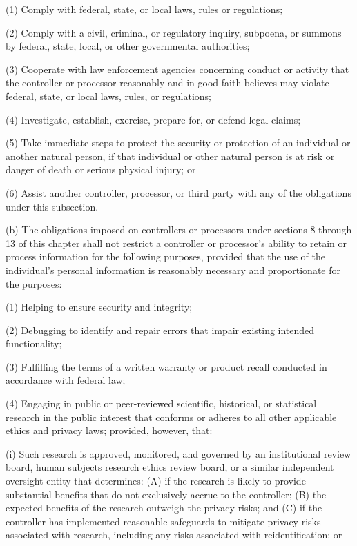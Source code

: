 (1) Comply with federal, state, or local laws, rules or regulations;

(2) Comply with a civil, criminal, or regulatory inquiry, subpoena, or summons by federal, state, local, or other governmental authorities;

(3) Cooperate with law enforcement agencies concerning conduct or activity that the controller or processor reasonably and in good faith believes may violate federal, state, or local laws, rules, or regulations;

(4) Investigate, establish, exercise, prepare for, or defend legal claims;

(5) Take immediate steps to protect the security or protection of an individual or another natural person, if that individual or other natural person is at risk or danger of death or serious physical injury; or

(6) Assist another controller, processor, or third party with any of the obligations under this subsection.

(b) The obligations imposed on controllers or processors under sections 8 through 13 of this chapter shall not restrict a controller or processor’s ability to retain or process information for the following purposes, provided that the use of the individual’s personal information is reasonably necessary and proportionate for the purposes: 

(1) Helping to ensure security and integrity;

(2) Debugging to identify and repair errors that impair existing intended functionality;

(3) Fulfilling the terms of a written warranty or product recall conducted in accordance with federal law;

(4) Engaging in public or peer-reviewed scientific, historical, or statistical research in the public interest that conforms or adheres to all other applicable ethics and privacy laws; provided, however, that:

(i) Such research is approved, monitored, and governed by an institutional review board, human subjects research ethics review board, or a similar independent oversight entity that determines: (A) if the research is likely to provide substantial benefits that do not exclusively accrue to the controller; (B) the expected benefits of the research outweigh the privacy risks; and (C) if the controller has implemented reasonable safeguards to mitigate privacy risks associated with research, including any risks associated with reidentification; or

